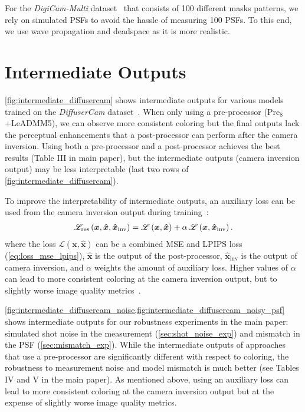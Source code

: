 For the \textit{DigiCam-Multi} dataset~\cite{digicam_multi} that consists of 100 different masks patterns,
we rely on simulated PSFs to avoid the hassle of measuring 100 PSFs.
To this end, we use wave propagation and deadspace as it is more realistic.


\section{Intermediate Outputs}
\label{app:intermediate}

\noindent\cref{fig:intermediate_diffusercam} shows intermediate outputs for various models trained on the \textit{DiffuserCam} dataset~\cite{Monakhova:19}.
When only using a pre-processor ($\text{Pre}_8$+LeADMM5),
we can observe more consistent coloring but the final outputs lack the perceptual enhancements that a post-processor can perform after the camera inversion.
Using both a pre-processor and a post-processor achieves the best results (Table III in main paper), 
but the intermediate outputs (\eg camera inversion output) may be less interpretable (last two rows of \cref{fig:intermediate_diffusercam}).

To improve the interpretability of intermediate outputs,
an auxiliary loss can be used from the camera inversion output during training~\cite{Perron2023}:
\begin{align}
        \mathscr{L}_{\text{res}}\left(\bm{x},\bm{\hat{x}},\bm{\hat{x}}_{\text{inv}}\right) = \mathscr{L}\left(\bm{x},\bm{\hat{x}}\right) + \alpha \hspace{0.2em} \mathscr{L}\left(\bm{x},\bm{\hat{x}}_{\text{inv}}\right).
\end{align}
where the loss $\mathscr{L}\left(\bm{x},\bm{\hat{x}}\right)$ can be a combined MSE and LPIPS loss (\ie \cref{eq:loss_mse_lpips}), $\bm{\hat{x}}$ is the output of the post-processor, 
$\bm{\hat{x}}_{\text{inv}}$ is the output of camera inversion, and $\alpha$ weights the amount of auxiliary loss.
Higher values of $\alpha$ can lead to more consistent coloring at the camera inversion output,
but to slightly worse image quality metrics~\cite{Perron2023}.

\cref{fig:intermediate_diffusercam_noise,fig:intermediate_diffusercam_noisy_psf} shows intermediate outputs for our robustness experiments in the main paper:
simulated shot noise in the measurement (\cref{sec:shot_noise_exp}) and mismatch in the PSF (\cref{sec:mismatch_exp}).
While the intermediate outputs of approaches that use a pre-processor are significantly different with respect to coloring,
the robustness to measurement noise and model mismatch is much better (see Tables IV and V in the main paper).
As mentioned above,
using an auxiliary loss can lead to more consistent coloring at the camera inversion output but at the expense of slightly worse image quality metrics.

